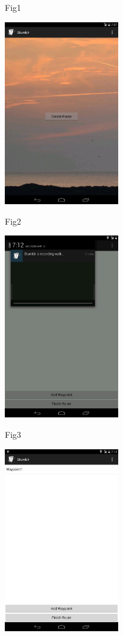 \documentclass{article}
\begin{document}
	\begin{center}
	\graphicspath{ {../} }
	Fig1
	
	\includegraphics[width=5cm]{1}

	\vspace{1in}
	Fig2
	
	\includegraphics[width=5cm]{2}
	
	\clearpage
	Fig3
	
	\includegraphics[width=5cm]{3}
	

\end{center}
\end{document}
